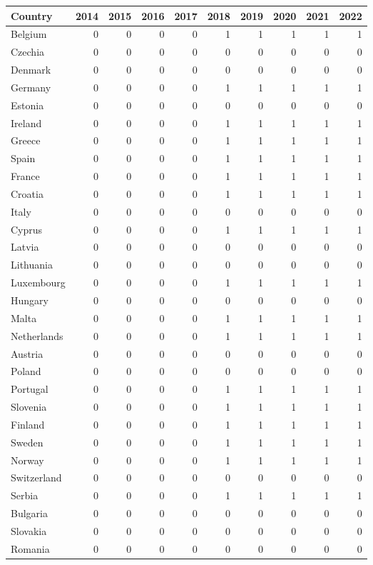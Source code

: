 \begin{tabular}{lrrrrrrrrr}
\toprule
Country & 2014 & 2015 & 2016 & 2017 & 2018 & 2019 & 2020 & 2021 & 2022 \\
\midrule
Belgium & 0 & 0 & 0 & 0 & 1 & 1 & 1 & 1 & 1 \\
Czechia & 0 & 0 & 0 & 0 & 0 & 0 & 0 & 0 & 0 \\
Denmark & 0 & 0 & 0 & 0 & 0 & 0 & 0 & 0 & 0 \\
Germany & 0 & 0 & 0 & 0 & 1 & 1 & 1 & 1 & 1 \\
Estonia & 0 & 0 & 0 & 0 & 0 & 0 & 0 & 0 & 0 \\
Ireland & 0 & 0 & 0 & 0 & 1 & 1 & 1 & 1 & 1 \\
Greece & 0 & 0 & 0 & 0 & 1 & 1 & 1 & 1 & 1 \\
Spain & 0 & 0 & 0 & 0 & 1 & 1 & 1 & 1 & 1 \\
France & 0 & 0 & 0 & 0 & 1 & 1 & 1 & 1 & 1 \\
Croatia & 0 & 0 & 0 & 0 & 1 & 1 & 1 & 1 & 1 \\
Italy & 0 & 0 & 0 & 0 & 0 & 0 & 0 & 0 & 0 \\
Cyprus & 0 & 0 & 0 & 0 & 1 & 1 & 1 & 1 & 1 \\
Latvia & 0 & 0 & 0 & 0 & 0 & 0 & 0 & 0 & 0 \\
Lithuania & 0 & 0 & 0 & 0 & 0 & 0 & 0 & 0 & 0 \\
Luxembourg & 0 & 0 & 0 & 0 & 1 & 1 & 1 & 1 & 1 \\
Hungary & 0 & 0 & 0 & 0 & 0 & 0 & 0 & 0 & 0 \\
Malta & 0 & 0 & 0 & 0 & 1 & 1 & 1 & 1 & 1 \\
Netherlands & 0 & 0 & 0 & 0 & 1 & 1 & 1 & 1 & 1 \\
Austria & 0 & 0 & 0 & 0 & 0 & 0 & 0 & 0 & 0 \\
Poland & 0 & 0 & 0 & 0 & 0 & 0 & 0 & 0 & 0 \\
Portugal & 0 & 0 & 0 & 0 & 1 & 1 & 1 & 1 & 1 \\
Slovenia & 0 & 0 & 0 & 0 & 1 & 1 & 1 & 1 & 1 \\
Finland & 0 & 0 & 0 & 0 & 1 & 1 & 1 & 1 & 1 \\
Sweden & 0 & 0 & 0 & 0 & 1 & 1 & 1 & 1 & 1 \\
Norway & 0 & 0 & 0 & 0 & 1 & 1 & 1 & 1 & 1 \\
Switzerland & 0 & 0 & 0 & 0 & 0 & 0 & 0 & 0 & 0 \\
Serbia & 0 & 0 & 0 & 0 & 1 & 1 & 1 & 1 & 1 \\
Bulgaria & 0 & 0 & 0 & 0 & 0 & 0 & 0 & 0 & 0 \\
Slovakia & 0 & 0 & 0 & 0 & 0 & 0 & 0 & 0 & 0 \\
Romania & 0 & 0 & 0 & 0 & 0 & 0 & 0 & 0 & 0 \\
\bottomrule
\end{tabular}
